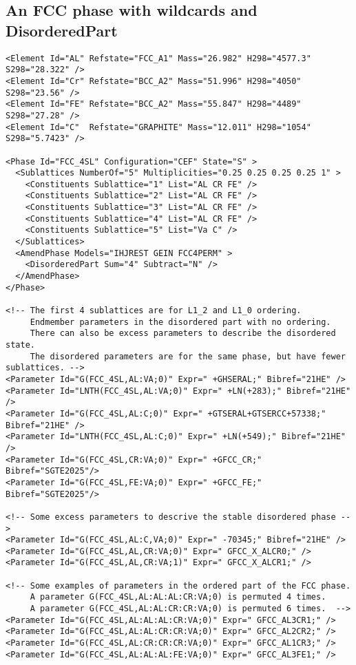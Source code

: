 \documentclass[preprint,review,12pt]{elsarticle}
\begin{document}
\begin{appendix}
{\begin{verbatim}
\end{verbatim}
}

\subsection{An FCC phase with wildcards and DisorderedPart}\label{sc:fcc-2part}

{\small
\begin{verbatim}
<Element Id="AL" Refstate="FCC_A1" Mass="26.982" H298="4577.3" S298="28.322" />
<Element Id="Cr" Refstate="BCC_A2" Mass="51.996" H298="4050" S298="23.56" />
<Element Id="FE" Refstate="BCC_A2" Mass="55.847" H298="4489" S298="27.28" />
<Element Id="C"  Refstate="GRAPHITE" Mass="12.011" H298="1054" S298="5.7423" />

<Phase Id="FCC_4SL" Configuration="CEF" State="S" >
  <Sublattices NumberOf="5" Multiplicities="0.25 0.25 0.25 0.25 1" >
    <Constituents Sublattice="1" List="AL CR FE" />
    <Constituents Sublattice="2" List="AL CR FE" />
    <Constituents Sublattice="3" List="AL CR FE" />
    <Constituents Sublattice="4" List="AL CR FE" />
    <Constituents Sublattice="5" List="Va C" />
  </Sublattices>
  <AmendPhase Models="IHJREST GEIN FCC4PERM" >
    <DisorderedPart Sum="4" Subtract="N" />
  </AmendPhase>
</Phase>

<!-- The first 4 sublattices are for L1_2 and L1_0 ordering.
     Endmember parameters in the disordered part with no ordering.
     There can also be excess parameters to describe the disordered state.
     The disordered parameters are for the same phase, but have fewer sublattices. -->
<Parameter Id="G(FCC_4SL,AL:VA;0)" Expr=" +GHSERAL;" Bibref="21HE" />
<Parameter Id="LNTH(FCC_4SL,AL:VA;0)" Expr=" +LN(+283);" Bibref="21HE" />
<Parameter Id="G(FCC_4SL,AL:C;0)" Expr=" +GTSERAL+GTSERCC+57338;" Bibref="21HE" />
<Parameter Id="LNTH(FCC_4SL,AL:C;0)" Expr=" +LN(+549);" Bibref="21HE" />
<Parameter Id="G(FCC_4SL,CR:VA;0)" Expr=" +GFCC_CR;" Bibref="SGTE2025"/>
<Parameter Id="G(FCC_4SL,FE:VA;0)" Expr=" +GFCC_FE;" Bibref="SGTE2025"/>

<!-- Some excess parameters to descrive the stable disordered phase -->
<Parameter Id="G(FCC_4SL,AL:C,VA;0)" Expr=" -70345;" Bibref="21HE" />
<Parameter Id="G(FCC_4SL,AL,CR:VA;0)" Expr=" GFCC_X_ALCR0;" />
<Parameter Id="G(FCC_4SL,AL,CR:VA;1)" Expr=" GFCC_X_ALCR1;" />

<!-- Some examples of parameters in the ordered part of the FCC phase.
     A parameter G(FCC_4SL,AL:AL:AL:CR:VA;0) is permuted 4 times.
     A parameter G(FCC_4SL,AL:AL:CR:CR:VA;0) is permuted 6 times.  -->
<Parameter Id="G(FCC_4SL,AL:AL:AL:CR:VA;0)" Expr=" GFCC_AL3CR1;" />
<Parameter Id="G(FCC_4SL,AL:AL:CR:CR:VA;0)" Expr=" GFCC_AL2CR2;" />
<Parameter Id="G(FCC_4SL,AL:CR:CR:CR:VA;0)" Expr=" GFCC_AL1CR3;" />
<Parameter Id="G(FCC_4SL,AL:AL:AL:FE:VA;0)" Expr=" GFCC_AL3FE1;" />


\end{verbatim}}
\end{appendix}
\end{document}

